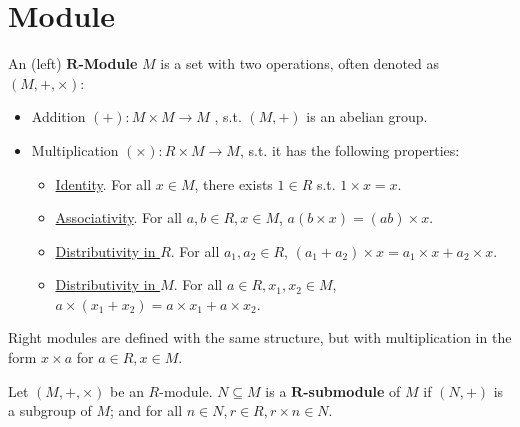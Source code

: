 \def\Ann{\mathrm{Ann}}
\def\Supp{\mathrm{Supp}}

\section{Module}

\begin{definition}[$R$-Module]
    An (left) \textbf{$\bm{R}$-Module} $M$ is a set with two operations, often denoted as $(M, +, \times)$:
    \begin{itemize}
        \item Addition $(+): M\times M \to M$ , s.t. $(M, +)$ is an abelian group.
        \item Multiplication $(\times): R\times M \to M$, s.t. it has the following properties:
            \begin{itemize}
                \item \underline{Identity}. For all $x\in M$, there exists $1\in R$ s.t. $1\times x = x$.
                \item \underline{Associativity}. For all $a, b\in R, x\in M$, $a(b\times x) = (ab)\times x$.
                \item \underline{Distributivity in $R$}. For all $a_1, a_2\in R$, $(a_1 + a_2)\times x = a_1\times x + a_2\times x$.
                \item \underline{Distributivity in $M$}. For all $a\in R, x_1, x_2\in M$, $a\times (x_1 + x_2) = a\times x_1 + a\times x_2$.
            \end{itemize}
    \end{itemize}
    Right modules are defined with the same structure, but with multiplication in the form $x\times a$ for $a\in R, x\in M$.
\end{definition}

\begin{definition}[Submodule]
    Let $(M, +, \times)$ be an $R$-module. $N \subseteq M$ is a \textbf{$\bm{R}$-submodule} of $M$ if $(N, +)$ is a subgroup of $M$; and for all $n\in N, r\in R, r\times n\in N$.
\end{definition}

